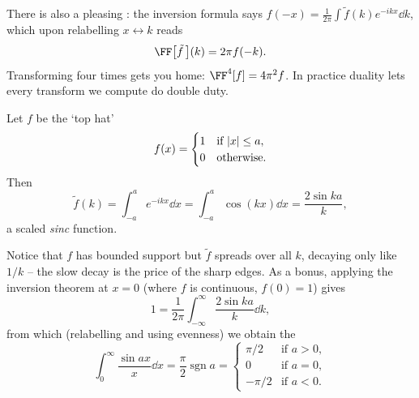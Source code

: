 \documentclass[a4paper]{scrartcl}
\newcommand{\sgn}{\operatorname{sgn}}
\begin{document}
There is also a pleasing : the inversion formula says $f(-x) = \frac{1}{2\pi}\int \tilde f(k) e^{-ikx} \dd k$, which upon relabelling $x \leftrightarrow k$ reads
$$
\FF\big[\tilde{f}\,\big](k) = 2 \pi f(-k).
$$
Transforming four times gets you home: $\FF^4[f] = 4\pi^2 f$. In practice duality lets every transform we compute do double duty.

\begin{example}
    Let $f$ be the `top hat'
    $$
    f(x) = \begin{cases}
        1 &\mbox{if } \lvert x\rvert \leq a, \\
        0 &\mbox{otherwise}.
    \end{cases}
    $$
    Then
    $$
    \tilde{f}(k) = \int_{-a}^{a} e^{-ikx} \dd x = \int_{-a}^a \cos (kx) \dd x = \frac{2 \sin ka}{k},
    $$
    a scaled \emph{sinc} function.

    \begin{center}
    \end{center}

    Notice that $f$ has bounded support but $\tilde f$ spreads over all $k$, decaying only like $1/k$ -- the slow decay is the price of the sharp edges. As a bonus, applying the inversion theorem at $x = 0$ (where $f$ is continuous, $f(0) = 1$) gives
    $$
    1 = \frac{1}{2\pi}\int_{-\infty}^{\infty} \frac{2 \sin ka}{k} \dd k,
    $$
    from which (relabelling and using evenness) we obtain the 
    $$
    \int_0^{\infty} \frac{\sin a x}{x} \dd x = \frac{\pi}{2}\sgn a = \begin{cases}
        \pi/2 &\mbox{if } a > 0, \\
        0 &\mbox{if } a = 0, \\
        -\pi/2 &\mbox{if } a < 0.
    \end{cases}
    $$
\end{example}
\end{document}
